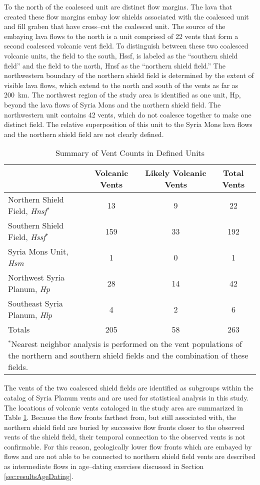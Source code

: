 To the north of the coalesced unit are distinct flow margins. The lava that created these flow margins embay low shields associated with the coalesced unit and fill graben that have cross--cut the coalesced unit. The source of the embaying lava flows to the north is a unit comprised of 22 vents that form a second coalesced volcanic vent field. To distinguish between these two coalesced volcanic units, the field to the south, Hssf, is labeled as the ``southern shield field'' and the field to the north, Hnsf as the ``northern shield field.'' The northwestern boundary of the northern shield field is determined by the extent of visible lava flows, which extend to the north and south of the vents as far as 200~km. The northwest region of the study area is identified as one unit, Hp, beyond the lava flows of Syria Mons and the northern shield field. The northwestern unit contains 42 vents, which do not coalesce together to make one distinct field. The relative superposition of this unit to the Syria Mons lava flows and the northern shield field are not clearly defined.

\begin{table}
\centering
\caption{Summary of Vent Counts in Defined Units}
\label{tab-ventct}
\begin{tabular}{l c c c}
\toprule
& Volcanic Vents & Likely Volcanic Vents & Total Vents  \\
\midrule
Northern Shield Field, \textit{Hnsf}$^*$ & 13 & 9 & 22 \\
Southern Shield Field, \textit{Hssf}$^*$ & 159 & 33 & 192 \\
Syria Mons Unit, \textit{Hsm} & 1 & 0 & 1 \\
Northwest Syria Planum, \textit{Hp} & 28 & 14 & 42 \\
Southeast Syria Planum, \textit{Hlp} & 4 & 2 & 6 \\
\midrule
Totals & 205 & 58 & 263 \\
\bottomrule
\multicolumn{4}{p{0.95\linewidth}}{$^*$Nearest neighbor analysis is performed on the vent populations of the northern and southern shield fields and the combination of these fields.}
\end{tabular}
\end{table}


The vents of the two coalesced shield fields are identified as subgroups within the catalog of Syria Planum vents and are used for statistical analysis in this study. The locations of volcanic vents cataloged in the study area are summarized in Table \ref{tab-ventct}. Because the flow fronts farthest from, but still associated with, the northern shield field are buried by successive flow fronts closer to the observed vents of the shield field, their temporal connection to the observed vents is not confirmable. For this reason, geologically lower flow fronts which are embayed by flows and are not able to be connected to northern shield field vents are described as intermediate flows in age--dating exercises discussed in Section \ref{sec:resultsAgeDating}.

